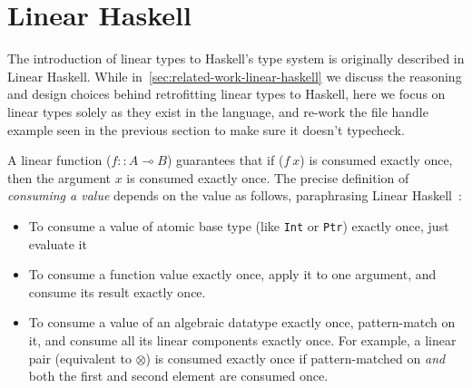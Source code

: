 \documentclass[]{lwnovathesis}
\newcommand{\lolli}{\multimap}
\newcommand{\tensor}{\otimes}
\begin{document}



\section{Linear Haskell\label{sec:linear-haskell}}


The introduction of linear types to Haskell's type system is originally
described in Linear Haskell\cite{cite:linearhaskell}. While
in~\ref{sec:related-work-linear-haskell} we discuss the reasoning and design
choices behind retrofitting linear types to Haskell, here we focus on
linear types solely as they exist in the language, and re-work the file
handle example seen in the previous section to make sure it doesn't typecheck.

A linear function ($f :: A \lolli B$) guarantees that if ($f~x$) is consumed
exactly once, then the argument $x$ is consumed exactly once. The precise
definition of \emph{consuming a value} depends on the value as follows,
paraphrasing Linear Haskell~\cite{cite:linearhaskell}:

\begin{itemize}
    \item To consume a value of atomic base type (like \texttt{Int} or
        \texttt{Ptr}) exactly once, just evaluate it
    \item To consume a function value exactly once, apply it to one argument,
        and consume its result exactly once.
    \item To consume a value of an algebraic datatype exactly once,
        pattern-match on it, and consume all its linear components exactly once.
        For example, a linear pair (equivalent to $\tensor$) is consumed exactly
        once if pattern-matched on \emph{and} both the first and second element are
        consumed once.
\end{itemize}
\end{document}
